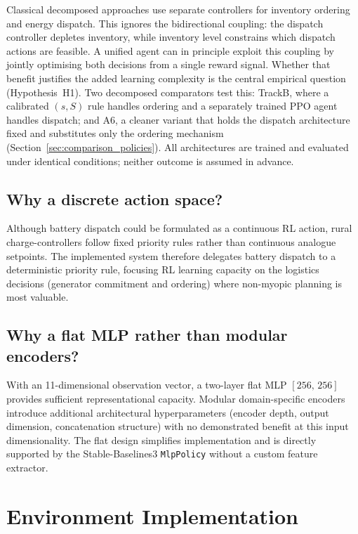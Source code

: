 Classical decomposed approaches use separate controllers for inventory
ordering and energy dispatch. This ignores the bidirectional coupling: the
dispatch controller depletes inventory, while inventory level constrains
which dispatch actions are feasible. A unified agent can in principle
exploit this coupling by jointly optimising both decisions from a single
reward signal. Whether that benefit justifies the added learning complexity
is the central empirical question (Hypothesis~H1). Two decomposed
comparators test this: TrackB, where a calibrated $(s,S)$ rule handles
ordering and a separately trained PPO agent handles dispatch; and A6, a
cleaner variant that holds the dispatch architecture fixed and substitutes
only the ordering mechanism (Section~\ref{sec:comparison_policies}). All
architectures are trained and evaluated under identical conditions;
neither outcome is assumed in advance.

\subsection{Why a discrete action space?}

Although battery dispatch could be formulated as a continuous RL action,
rural charge-controllers follow fixed priority rules rather than
continuous analogue setpoints. The implemented system therefore delegates
battery dispatch to a deterministic priority rule, focusing RL learning
capacity on the logistics decisions (generator commitment and ordering)
where non-myopic planning is most valuable.

\subsection{Why a flat MLP rather than modular encoders?}

With an 11-dimensional observation vector, a two-layer flat MLP
$[256,\,256]$ provides sufficient representational capacity. Modular
domain-specific encoders introduce additional architectural
hyperparameters (encoder depth, output dimension, concatenation
structure) with no demonstrated benefit at this input dimensionality. The
flat design simplifies implementation and is directly supported by the
Stable-Baselines3 \texttt{MlpPolicy} without a custom feature extractor.


\section{Environment Implementation}
\label{sec:env_impl}

